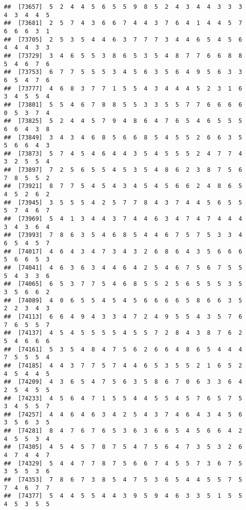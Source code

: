 \documentclass[
]{book}
\begin{document}
\begin{verbatim}
##  [73657]  5  2  4  4  5  6  5  5  9  8  5  2  4  3  4  4  3  3  3  4  3  4  4  5
##  [73681]  2  5  7  4  3  6  6  7  4  4  3  7  6  4  1  4  4  5  7  6  6  6  3  1
##  [73705]  2  5  3  5  4  4  6  3  7  7  7  3  4  4  6  5  4  5  6  4  4  4  3  3
##  [73729]  3  4  6  5  5  3  8  6  5  3  5  4  8  7  7  6  6  8  8  5  4  6  7  6
##  [73753]  6  7  7  5  5  5  3  4  5  6  3  5  6  4  9  5  6  3  3  6  5  4  7  6
##  [73777]  4  6  8  3  7  7  1  5  5  4  3  4  4  4  5  2  3  1  6  3  4  5  5  4
##  [73801]  5  5  4  6  7  8  8  5  5  3  3  5  5  7  7  6  6  6  6  0  5  3  7  4
##  [73825]  5  2  4  4  5  7  9  4  8  6  4  7  6  5  4  6  5  5  5  6  6  4  3  8
##  [73849]  3  4  3  4  6  8  5  6  6  8  5  4  5  5  2  6  6  3  5  5  6  6  4  3
##  [73873]  5  7  4  5  4  6  4  4  3  5  4  5  5  5  2  4  7  7  4  3  2  5  5  4
##  [73897]  7  2  5  6  5  5  4  5  3  5  4  8  6  2  3  8  7  5  6  7  8  5  5  2
##  [73921]  8  7  7  5  4  5  4  3  4  5  4  5  6  6  2  4  8  6  5  4  5  2  6  2
##  [73945]  3  5  5  5  4  2  5  7  7  8  4  3  7  4  4  5  6  5  5  5  7  4  6  7
##  [73969]  5  4  1  3  4  4  3  7  4  4  6  3  4  7  4  7  4  4  4  3  4  3  6  4
##  [73993]  7  8  6  3  5  4  6  8  5  4  4  6  7  5  7  5  3  3  4  6  5  4  5  7
##  [74017]  4  6  4  3  4  7  3  4  3  2  6  8  6  4  3  5  6  6  6  5  6  6  5  3
##  [74041]  4  6  3  6  3  4  4  6  4  2  5  4  6  7  5  6  7  5  5  5  4  3  3  6
##  [74065]  6  5  3  7  7  5  4  6  8  5  5  2  5  6  5  5  5  3  5  3  5  6  6  2
##  [74089]  4  0  6  5  5  4  5  4  5  6  6  6  6  5  8  6  6  3  5  2  2  3  4  3
##  [74113]  6  6  4  9  4  3  3  4  7  2  4  9  5  5  4  3  5  7  6  7  6  5  5  7
##  [74137]  4  5  4  5  5  5  5  4  5  5  7  2  8  4  3  8  7  6  2  5  4  6  6  6
##  [74161]  5  3  5  4  8  4  7  5  6  2  6  6  4  8  6  5  4  4  4  7  5  5  5  4
##  [74185]  4  4  3  7  7  5  7  4  4  6  5  3  5  5  2  1  6  5  2  4  5  4  4  5
##  [74209]  4  3  6  5  4  7  5  6  3  5  8  6  7  0  6  3  3  6  4  2  5  4  5  5
##  [74233]  4  5  6  4  7  1  5  5  4  4  5  5  4  5  7  6  5  7  5  3  4  5  5  7
##  [74257]  4  4  6  4  6  3  4  2  5  4  3  7  4  6  4  3  4  5  6  3  5  6  3  5
##  [74281]  8  4  7  6  7  6  5  3  6  3  6  6  5  4  5  6  6  4  2  4  5  5  3  4
##  [74305]  4  5  4  5  7  8  7  5  4  7  5  6  4  7  3  5  3  2  6  4  7  4  4  7
##  [74329]  5  4  4  7  7  8  7  5  6  6  7  4  5  5  7  3  6  7  5  3  5  5  3  6
##  [74353]  7  8  6  7  3  8  5  4  7  5  3  6  5  4  4  5  5  7  5  7  4  6  7  7
##  [74377]  5  4  4  5  5  4  4  3  9  5  9  4  6  3  3  5  1  5  5  4  5  3  5  5

\end{verbatim}
\end{document}
